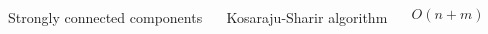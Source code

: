 \begin{minipage}[t]{\textwidth}
    \begin{columns}
        \begin{column}{0.25\textwidth}
        \centering
        Strongly connected components
        \end{column}
    \hfill
        \begin{column}{0.25\textwidth}
        \centering
        Kosaraju-Sharir algorithm
        \end{column}
    \hfill
        \begin{column}{0.25\textwidth}
        \centering
        $O(n+m)$
        \end{column}
    \hfill
        \begin{column}{0.25\textwidth}
        \centering
        \resizebox{0.65\textwidth}{!}{}
        \end{column}
    \end{columns}
\end{minipage}